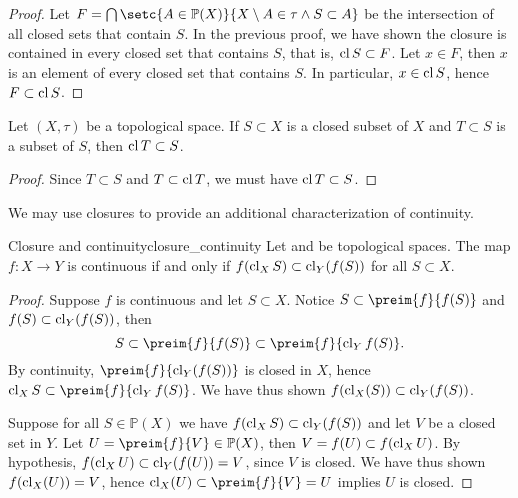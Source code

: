 \begin{proof}
    Let \(F = \bigcap \setc{A \in \mathbb{P}(X)}{X \setminus A \in \tau \land S \subset A}\) be the intersection of all closed sets that contain \(S\). In the previous proof, we have shown the closure is contained in every closed set that contains \(S\), that is, \(\operatorname{cl}{S} \subset F\). Let \(x \in F\), then \(x\) is an element of every closed set that contains \(S\). In particular, \(x \in \operatorname{cl}{S}\), hence \(F \subset \operatorname{cl}{S}\).
\end{proof}
\begin{corollary}
    Let \((X, \tau)\) be a topological space. If \(S \subset X\) is a closed subset of \(X\) and \(T \subset S\) is a subset of \(S\), then \(\operatorname{cl}{T} \subset S\).
\end{corollary}
\begin{proof}
    Since \(T \subset S\) and \(T \subset \operatorname{cl}{T}\), we must have \(\operatorname{cl}{T} \subset S\).
\end{proof}

We may use closures to provide an additional characterization of continuity.
\begin{theorem}{Closure and continuity}{closure_continuity}
    Let  and  be topological spaces. The map \(f : X \to Y\) is continuous if and only if \(f(\operatorname{cl}_XS) \subset \operatorname{cl}_Y(f(S))\) for all \(S \subset X\).
\end{theorem}
\begin{proof}
    Suppose \(f\) is continuous and let \(S \subset X\). Notice \(S \subset \preim{f}{f(S)}\) and \(f(S) \subset \operatorname{cl}_Y(f(S))\), then
    \begin{equation*}
        S \subset \preim{f}{f(S)} \subset \preim{f}{\cl_Y{f(S)}}.
    \end{equation*}
    By continuity, \(\preim{f}{\cl_Y(f(S))}\) is closed in \(X\), hence \(\cl_XS \subset \preim{f}{\cl_Y{f(S)}}\). We have thus shown \(f(\operatorname{cl}_X(S)) \subset \operatorname{cl}_Y(f(S))\).

    Suppose for all \(S \in \mathbb{P}(X)\) we have \(f(\operatorname{cl}_XS) \subset \operatorname{cl}_Y(f(S))\) and let \(V\) be a closed set in \(Y\). Let \(U = \preim{f}{V} \in \mathbb{P}(X)\), then \(V = f(U) \subset f(\operatorname{cl}_X U)\). By hypothesis, \(f(\operatorname{cl}_XU) \subset \operatorname{cl}_Y(f(U)) = V\), since \(V\) is closed. We have thus shown \(f(\operatorname{cl}_X(U)) = V\), hence \(\cl_X(U) \subset \preim{f}{V} = U\) implies \(U\) is closed.
\end{proof}

